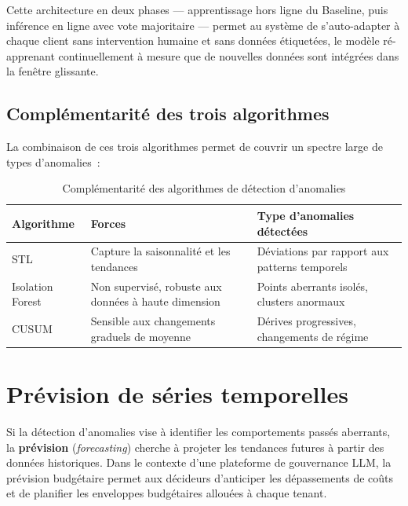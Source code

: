 Cette architecture en deux phases --- apprentissage hors ligne du Baseline, puis inférence en ligne avec vote majoritaire --- permet au système de s'auto-adapter à chaque client sans intervention humaine et sans données étiquetées, le modèle ré-apprenant continuellement à mesure que de nouvelles données sont intégrées dans la fenêtre glissante.

\subsection{Complémentarité des trois algorithmes}

La combinaison de ces trois algorithmes permet de couvrir un spectre large de types d'anomalies~:

\begin{table}[H]
\centering
\caption{Complémentarité des algorithmes de détection d'anomalies}
\label{tab:algo_complement}
\begin{tabularx}{\textwidth}{|l|X|X|}
\hline
\textbf{Algorithme} & \textbf{Forces} & \textbf{Type d'anomalies détectées} \\
\hline
STL & Capture la saisonnalité et les tendances & Déviations par rapport aux patterns temporels \\
\hline
Isolation Forest & Non supervisé, robuste aux données à haute dimension & Points aberrants isolés, clusters anormaux \\
\hline
CUSUM & Sensible aux changements graduels de moyenne & Dérives progressives, changements de régime \\
\hline
\end{tabularx}
\end{table}


\section{Prévision de séries temporelles}
\label{sec:forecasting}

Si la détection d'anomalies vise à identifier les comportements passés aberrants, la \textbf{prévision} (\textit{forecasting}) cherche à projeter les tendances futures à partir des données historiques. Dans le contexte d'une plateforme de gouvernance LLM, la prévision budgétaire permet aux décideurs d'anticiper les dépassements de coûts et de planifier les enveloppes budgétaires allouées à chaque tenant.

